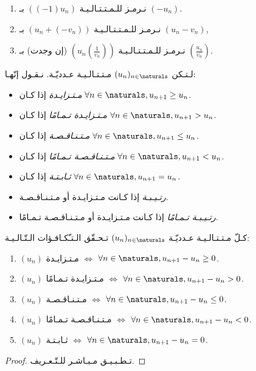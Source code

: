\begin{remark}
    \begin{enumerate}
        \item نـرمـز للـمـتـتـالـيـة \(\left((-1)u_n\right)\) بـ \((-u_n)\).
        \item نـرمـز للـمـتـتـالـيـة \((u_n + (-v_n))\) بـ \((u_n - v_n)\),
        \item نـرمـز للـمـتـتـالـيـة \(\left(u_n\left(\frac{1}{v_n}\right)\right)\) (إن وجدت)
              بـ \(\left(\frac{u_n}{v_n}\right)\).
    \end{enumerate}
\end{remark}

\begin{definition}%
    \label{def:sequences:monotony-and-variations}
    لـتـكن \((u_n)_{n \in \naturals}\) مـتـتـالـيـة عـدديّـة. نـقـول إنّهـا:
    \begin{itemize}
        \item \emph{مـتـزايـدة} إذا كـان \(\forall n \in \naturals, u_{n+1} \ge u_n\).
        \item \emph{مـتـزايـدة تـمـامًا} إذا كـان \(\forall n \in \naturals, u_{n+1} > u_n\).
        \item \emph{مـتـنـاقـصـة} إذا كـان \(\forall n \in \naturals, u_{n+1} \le u_n\).
        \item \emph{مـتـنـاقـصـة تـمـامًا} إذا كـان \(\forall n \in \naturals, u_{n+1} < u_n\).
        \item \emph{ثـابـتـة} إذا كـان \(\forall n \in \naturals, u_{n+1} = u_n\).
        \item \emph{رتـيـبـة} إذا كـانت مـتـزايـدة أو مـتـنـاقـصـة.
        \item \emph{رتـيـبـة تـمـامًا} إذا كـانت مـتـزايـدة أو مـتـنـاقـصـة تـمـامًا.
    \end{itemize}
\end{definition}

\begin{theorem}%
    \label{thm:sequences:variations}
    كـلّ مـتـتـالـيـة عـدديّـة \((u_n)_{n \in \naturals}\) تـحـقّق الـتـّكـافـؤات الـتّـالـيـة:
    \begin{enumerate}
        \item \((u_n)\) مـتـزايـدة  \(\iff\) \(\forall n \in \naturals, u_{n+1} - u_n \ge 0 \).
        \item \((u_n)\) مـتـزايـدة تـمـامًا \(\iff\) \(\forall n \in \naturals, u_{n+1} - u_n > 0 \).
        \item \((u_n)\) مـتـنـاقـصـة \(\iff\) \(\forall n \in \naturals, u_{n+1} - u_n \le 0 \).
        \item \((u_n)\) مـتـنـاقـصـة تـمـامًا \(\iff\) \(\forall n \in \naturals, u_{n+1} - u_n < 0 \).
        \item \((u_n)\) ثـابـتـة \(\iff\) \(\forall n \in \naturals, u_{n+1} - u_n = 0 \).
    \end{enumerate}
\end{theorem}
\begin{proof}%
    تـطـبـيـق مـبـاشـر للـتّـعـريف.
\end{proof}